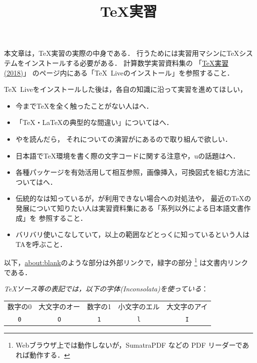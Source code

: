 \documentclass{ltjsarticle}
\title{\TeX 実習}
\begin{document}
\zw
\maketitle

本文章は，\TeX 実習の実際の中身である．
行うためには実習用マシンに\TeX システムをインストールする必要がある．
計算数学実習資料集の
「\href{https://github.com/utmsks/KSImaterial/blob/master/contents/tex/tex_practice.md}{\TeX 実習(2018)}」
のページ内にある「\TeX~Liveのインストール」を参照すること．


\TeX~Liveをインストールした後は，各自の知識に沿って実習を進めてほしい，
\begin{itemize}
\item 今まで\TeX を全く触ったことがない人はへ．
\item 「\TeX・\LaTeX の典型的な間違い」についてはへ．
\item {}やを読んだら，
 それについての演習がにあるので取り組んで欲しい．
\item 日本語で\TeX 環境を書く際の文字コードに関する注意や，u\pTeX の話題はへ．
\item 各種パッケージを有効活用して相互参照，画像挿入，可換図式を組む方法についてはへ．
\item 伝統的な\pLaTeX は知っているが，\pLaTeX が利用できない場合への対処法や，
最近の\TeX の発展について知りたい人は実習資料集にある「\pTeX 系列以外による日本語文書作成」を
参照すること．
\item バリバリ使いこなしていて，以上の範囲などとっくに知っているという人はTAを呼ぶこと．
\end{itemize}

以下，\url{about:blank}のような部分は外部リンクで，緑字の部分
\footnote{Webブラウザ上では動作しないが，SumatraPDF などの PDF リーダーであれば動作する．}
は文書内リンクである．

\bigskip

\emph{\TeX ソース等の表記では，以下の字体(Inconsolata)を使っている}：
\begin{center}
\begin{tabular}{ccccc}
\toprule
数字の0&大文字のオー&数字の1&小文字のエル&大文字のアイ\\
\cmidrule(lr){1-2}\cmidrule(lr){3-5}
\Large\tt 0&\Large\tt O
&\Large\tt 1&\Large\tt l&\Large\tt I\\
\bottomrule
\end{tabular}
\end{center}
\end{document}
